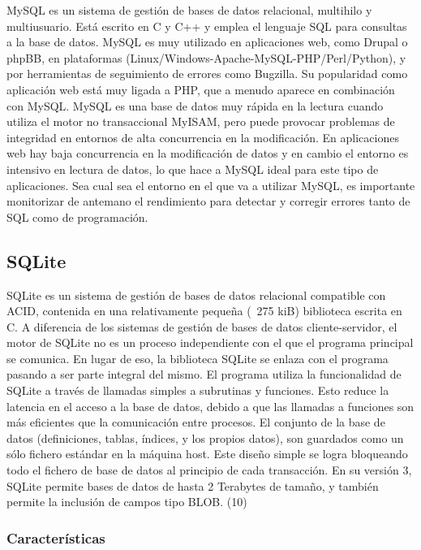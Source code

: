 MySQL es un sistema de gestión de bases de datos relacional, multihilo y multiusuario. Está escrito en C y C++ y emplea el lenguaje SQL para consultas a la base de datos.
MySQL es muy utilizado en aplicaciones web, como Drupal o phpBB, en plataformas (Linux/Windows-Apache-MySQL-PHP/Perl/Python), y por herramientas de seguimiento de errores como Bugzilla. Su popularidad como aplicación web está muy ligada a PHP, que a menudo aparece en combinación con MySQL.
MySQL es una base de datos muy rápida en la lectura cuando utiliza el motor no transaccional MyISAM, pero puede provocar problemas de integridad en entornos de alta concurrencia en la modificación. En aplicaciones web hay baja concurrencia en la modificación de datos y en cambio el entorno es intensivo en lectura de datos, lo que hace a MySQL ideal para este tipo de aplicaciones. Sea cual sea el entorno en el que va a utilizar MySQL, es importante monitorizar de antemano el rendimiento para detectar y corregir errores tanto de SQL como de programación.



\subsection{SQLite} %
\label{sub:sqlite}


SQLite es un sistema de gestión de bases de datos relacional compatible con ACID, contenida en una relativamente pequeña (~275 kiB) biblioteca escrita en C. 
A diferencia de los sistemas de gestión de bases de datos cliente-servidor, el motor de SQLite no es un proceso independiente con el que el programa principal se comunica. En lugar de eso, la biblioteca SQLite se enlaza con el programa pasando a ser parte integral del mismo. El programa utiliza la funcionalidad de SQLite a través de llamadas simples a subrutinas y funciones. Esto reduce la latencia en el acceso a la base de datos, debido a que las llamadas a funciones son más eficientes que la comunicación entre procesos. El conjunto de la base de datos (definiciones, tablas, índices, y los propios datos), son guardados como un sólo fichero estándar en la máquina host. Este diseño simple se logra bloqueando todo el fichero de base de datos al principio de cada transacción.
En su versión 3, SQLite permite bases de datos de hasta 2 Terabytes de tamaño, y también permite la inclusión de campos tipo BLOB. (10) \cite{sqlite}

\subsubsection{Características} %
\label{ssub:caracteristicas}

